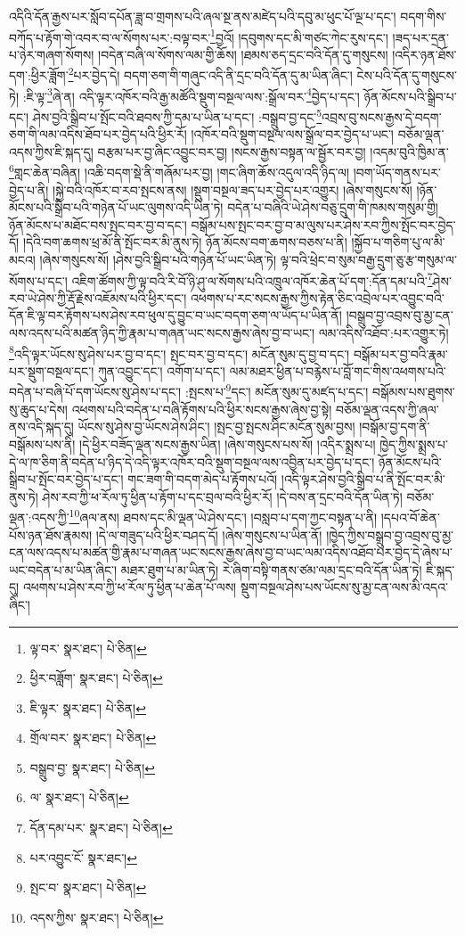 འདིའི་དོན་རྒྱས་པར་སློབ་དཔོན་ཟླ་བ་གྲགས་པའི་ཞལ་སྔ་ནས་མཛེད་པའི་དབུ་མ་ཕུང་པོ་ལྔ་པ་དང་། བདག་གིས་བཀོད་པ་རྟོག་གེ་འབར་བ་ལ་སོགས་པར་:བལྟ་བར་\footnote{ལྟ་བར་  སྣར་ཐང་།  པེ་ཅིན། }བྱའོ། །དབུགས་དང་མི་གཙང་ཀེང་རུས་དང་། །ཟད་པར་དྲན་པ་ཉེར་གཞག་སོགས། །བདེན་བཞི་ལ་སོགས་ལམ་གྱི་ཆོས། །ཐམས་ཅད་དྲང་བའི་དོན་དུ་གསུངས། །འདིར་ཉན་ཐོས་དག་:ཕྱིར་ཟློག་\footnote{ཕྱིར་བཟློག་  སྣར་ཐང་།  པེ་ཅིན། }པར་བྱེད་དེ། བདག་ཅག་གི་གཞུང་འདི་ནི་དྲང་བའི་དོན་དུ་མ་ཡིན་ཞིང་། ངེས་པའི་དོན་དུ་གསུངས་ཏེ། :ཇི་ལྟ་\footnote{ཇི་ལྟར་  སྣར་ཐང་།  པེ་ཅིན། }ཞེ་ན། འདི་ལྟར་འཁོར་བའི་རྒྱ་མཚོའི་སྡུག་བསྔལ་ལས་:སྒྲོལ་བར་\footnote{གྲོལ་བར་  སྣར་ཐང་།  པེ་ཅིན། }བྱེད་པ་དང་། ཉོན་མོངས་པའི་སྒྲིབ་པ་དང་། ཤེས་བྱའི་སྒྲིབ་པ་སྤོང་བའི་ཐབས་ཀྱི་དམ་པ་ཡིན་པ་དང་། :བསྒྲུབ་བྱ་དང་\footnote{བསྒྲུབ་བྱ་  སྣར་ཐང་།  པེ་ཅིན། }འབྲས་བུ་སངས་རྒྱས་དེ་བདག་ཅག་གི་ལམ་འདིས་ཐོབ་པར་བྱེད་པའི་ཕྱིར་རོ། །འཁོར་བའི་སྡུག་བསྔལ་ལས་སྒྲོལ་བར་བྱེད་པ་ཡང་། བཅོམ་ལྡན་འདས་ཀྱིས་ཇི་སྐད་དུ། བརྩམ་པར་བྱ་ཞིང་འབྱུང་བར་བྱ། །སངས་རྒྱས་བསྟན་ལ་སྦྱོར་བར་བྱ། །འདམ་བུའི་ཁྱིམ་ན་\footnote{ལ་  སྣར་ཐང་།  པེ་ཅིན། }གླང་ཆེན་བཞིན། །འཆི་བདག་སྡེ་ནི་གཞོམ་པར་བྱ། །གང་ཞིག་ཆོས་འདུལ་འདི་ཉིད་ལ། །བག་ཡོད་གནས་པར་བྱེད་པ་ནི། །སྐྱེ་བའི་འཁོར་བ་རབ་སྤངས་ནས། །སྡུག་བསྔལ་ཟད་པར་བྱེད་པར་འགྱུར། །ཞེས་གསུངས་སོ། །ཉོན་མོངས་པའི་སྒྲིབ་པའི་གཉེན་པོ་ཡང་ལུགས་འདི་ཡིན་ཏེ། བདེན་པ་བཞིའི་ཡེ་ཤེས་བཅུ་དྲུག་གི་ཁམས་གསུམ་གྱི། ཉོན་མོངས་པ་མཐོང་བས་སྤང་བར་བྱ་བ་དང་། བསྒོམ་པས་སྤང་བར་བྱ་བ་མ་ལུས་པར་ཤེས་རབ་ཀྱིས་སྤོང་བར་བྱེད་དོ། །དེའི་བག་ཆགས་ཕྲ་མོ་ནི་སྤོང་བར་མི་ནུས་ཏེ། ཉོན་མོངས་བག་ཆགས་བཅས་པ་ནི། །སྐྱོབ་པ་གཅིག་པུ་ལ་མི་མངའ། །ཞེས་གསུངས་སོ། །ཤེས་བྱའི་སྒྲིབ་པའི་གཉེན་པོ་ཡང་ཡིན་ཏེ། ལྟ་བའི་ཕྲེང་བ་སུམ་བརྒྱ་དྲུག་ཅུ་རྩ་གསུམ་ལ་སོགས་པ་དང་། འཇིག་ཚོགས་ཀྱི་ལྟ་བའི་རི་བོ་ཉི་ཤུ་ལ་སོགས་པའི་འཁྲུལ་འཁོར་ཆེན་པོ་དག་:དོན་དམ་པའི་\footnote{དོན་དམ་པར་  སྣར་ཐང་།  པེ་ཅིན། }ཤེས་རབ་ཡེ་ཤེས་ཀྱི་རྡོ་རྗེས་འཇོམས་པའི་ཕྱིར་དང་། འཕགས་པ་རང་སངས་རྒྱས་ཀྱིས་རྟེན་ཅིང་འབྲེལ་པར་འབྱུང་བའི་དོན་ཇི་ལྟ་བར་རྟོགས་པས་ཤེས་རབ་ཕུལ་དུ་བྱུང་བ་ཡང་བདག་ཅག་ལ་ཡོད་པ་ཡིན་ནོ། །བསྒྲུབ་བྱ་འབྲས་བུ་མྱ་ངན་ལས་འདས་པའི་མཚན་ཉིད་ཀྱི་རྣམ་པ་གཞན་ཡང་སངས་རྒྱས་ཞེས་བྱ་བ་ཡང་། ལམ་འདིས་འཐོབ་:པར་འགྱུར་ཏེ། \footnote{པར་འབྱུང་ངོ་  སྣར་ཐང་། }འདི་ལྟར་ཡོངས་སུ་ཤེས་པར་བྱ་བ་དང་། སྤང་བར་བྱ་བ་དང་། མངོན་སུམ་དུ་བྱ་བ་དང་། བསྒོམ་པར་བྱ་བའི་རྣམ་པར་སྡུག་བསྔལ་དང་། ཀུན་འབྱུང་དང་། འགོག་པ་དང་། ལམ་མཐར་ཕྱིན་པ་བརྙེས་པ་བློ་གང་གིས་འཕགས་པའི་བདེན་པ་བཞི་པོ་དག་ཡོངས་སུ་ཤེས་པ་དང་། :སྤངས་པ་\footnote{སྤང་བ་  སྣར་ཐང་།  པེ་ཅིན། }དང་། མངོན་སུམ་དུ་མཛད་པ་དང་། བསྒོམས་པས་ཐུགས་སུ་ཆུད་པ་དེས། འཕགས་པའི་བདེན་པ་བཞི་རྟོགས་པའི་ཕྱིར་སངས་རྒྱས་ཞེས་བྱ་སྟེ། བཅོམ་ལྡན་འདས་ཀྱི་ཞལ་ནས་འདི་སྐད་དུ། ཡོངས་སུ་ཤེས་བྱ་ཡོངས་ཤེས་ཤིང་། །སྤང་བྱ་སྤངས་ཤིང་མངོན་སུམ་བྱས། །བསྒོམ་བྱ་དག་ནི་བསྒོམས་པས་ནི། །དེ་ཕྱིར་བཟོད་ལྡན་སངས་རྒྱས་ཡིན། །ཞེས་གསུངས་པས་སོ། །འདིར་སྨྲས་པ། ཁྱེད་ཀྱིས་སྨྲས་པ་དེ་ལ་ཁ་ཅིག་ནི་བདེན་པ་ཉིད་དེ་འདི་ལྟར་འཁོར་བའི་སྡུག་བསྔལ་ལས་འབྱིན་པར་བྱེད་པ་དང་། ཉོན་མོངས་པའི་སྒྲིབ་པ་སྤོང་བར་བྱེད་པ་དང་། གང་ཟག་གི་བདག་མེད་པ་རྟོགས་པའོ། །འདི་ལྟར་ཤེས་བྱའི་སྒྲིབ་པ་ནི་སྤོང་བར་མི་ནུས་ཏེ། ཤེས་རབ་ཀྱི་ཕ་རོལ་ཏུ་ཕྱིན་པ་རྟོག་པ་དང་བྲལ་བའི་ཕྱིར་རོ། །དེ་བས་ན་དྲང་བའི་དོན་ཡིན་ཏེ། བཅོམ་ལྡན་:འདས་ཀྱི་\footnote{འདས་ཀྱིས་  སྣར་ཐང་།  པེ་ཅིན། }ཞལ་ནས། ཐབས་དང་མི་ལྡན་ཡེ་ཤེས་དང་། །བསླབ་པ་དག་ཀྱང་བསྟན་པ་ནི། །དཔའ་བོ་ཆེན་པོས་ཉན་ཐོས་རྣམས། །དེ་ལ་གཟུད་པའི་ཕྱིར་བཤད་དོ། །ཞེས་གསུངས་པ་ཡིན་ནོ། །ཁྱེད་ཀྱིས་བསྒྲུབ་བྱ་འབྲས་བུ་མྱ་ངན་ལས་འདས་པ་མཚན་གྱི་རྣམ་པ་གཞན་ཡང་སངས་རྒྱས་ཞེས་བྱ་བ་ཡང་ལམ་འདིས་འཐོབ་པར་བྱེད་དེ་ཞེས་པ་ཡང་བདེན་པ་མ་ཡིན་ཞིང་། མཐར་ཐུག་པ་མ་ཡིན་ཏེ། རེ་ཞིག་བསྟི་གནས་ཙམ་ལམ་དྲང་བའི་དོན་ཡིན་ཏེ། ཇི་སྐད་དུ། འཕགས་པ་ཤེས་རབ་ཀྱི་ཕ་རོལ་ཏུ་ཕྱིན་པ་ཆེན་པོ་ལས། སྡུག་བསྔལ་ཤེས་པས་ཡོངས་སུ་མྱ་ངན་ལས་མི་འདའ་ཞིང་། 